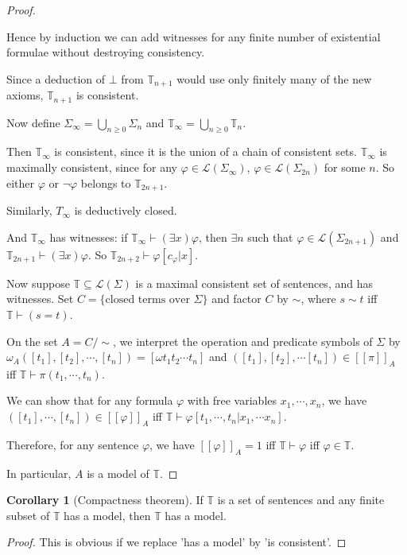 \documentclass[a4paper]{article}
\theoremstyle{definition}
\newtheorem*{cor}{Corollary}
\newcommand{\T}{\mathbb{T}}
\newcommand{\La}{\mathcal{L}}
\begin{document}
\begin{proof}
\begin{itemize}
    Hence by induction we can add witnesses for any finite number of existential formulae without destroying consistency.

    Since a deduction of $\bot$ from $\T_{n + 1}$ would use only finitely many of the new axioms, $\T_{n + 1}$ is consistent.
  \end{itemize}
  
  Now define $\Sigma_{\infty} = \bigcup_{n \geq 0}\Sigma_{n}$ and $\T_{\infty} = \bigcup_{n \geq 0}\T_n$.

  Then $\T_{\infty}$ is consistent, since it is the union of a chain of consistent sets. $\T_{\infty}$ is maximally consistent, since for any $\varphi\in \La(\Sigma_{\infty})$, $\varphi\in \La(\Sigma_{2n})$ for some $n$. So either $\varphi$ or $\neg \varphi$ belongs to $\T_{2n + 1}$.

  Similarly, $T_{\infty}$ is deductively closed.

  And $\T_{\infty}$ has witnesses: if $\T_{\infty}\vdash (\exists x)\varphi$, then $\exists n$ such that $\varphi\in \La(\Sigma_{2n + 1})$ and $\T_{2n + 1}\vdash (\exists x)\varphi$. So $\T_{2n + 2}\vdash \varphi[c_\varphi|x]$.

  Now suppose $\T\subseteq \La(\Sigma)$ is a maximal consistent set of sentences, and has witnesses. Set $C = \{\text{closed terms over }\Sigma\}$ and factor $C$ by $\sim$, where $s\sim t$ iff $\T\vdash (s = t)$.

  On the set $A = C/\sim$, we interpret the operation and predicate symbols of $\Sigma$ by $\omega_A([t_1], [t_2], \cdots, [t_n]) = [\omega t_1t_2\cdots t_n]$ and $([t_1],[t_2],\cdots [t_n])\in [\![\pi]\!]_A$ iff $\T\vdash \pi(t_1, \cdots, t_n)$.

  We can show that for any formula $\varphi$ with free variables $x_1, \cdots, x_n$, we have $([t_1], \cdots, [t_n])\in [\![\varphi]\!]_A$ iff $\T \vdash \varphi[t_1, \cdots, t_n|x_1, \cdots x_n]$.

  Therefore, for any sentence $\varphi$, we have $[\![\varphi]\!]_A = 1$ iff $\T \vdash \varphi$ iff $\varphi \in \T$.

  In particular, $A$ is a model of $\T$.
\end{proof}

\begin{cor}[Compactness theorem]
  If $\T$ is a set of sentences and any finite subset of $\T$ has a model, then $\T$ has a model.
\end{cor}

\begin{proof}
  This is obvious if we replace 'has a model' by 'is consistent'.
\end{proof}
\end{document}
